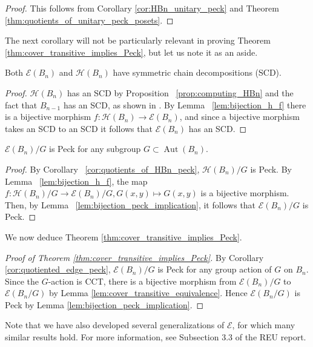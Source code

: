 \documentclass[smallextended, envcountsame, numbook]{svjour3}
\numberwithin{equation}{section}
\newcommand\Aut{\operatorname{Aut}}
\begin{document}
\begin{proof}
This follows from Corollary \ref{cor:HBn_unitary_peck} and Theorem \ref{thm:quotients_of_unitary_peck_posets}.
\end{proof}

The next corollary will not be particularly relevant in proving Theorem \ref{thm:cover_transitive_implies_Peck}, but let us note it as an aside.

\begin{corollary}
Both $\mathcal{E}(B_n)$ and $\mathcal H(B_n)$ have symmetric chain decompositions (SCD).
\end{corollary}


\begin{proof}
$\mathcal{H}(B_n)$ has an SCD by Proposition ~\ref{prop:computing_HBn} and the fact that $B_{n-1}$ has an SCD, as shown in \cite{greene}.  By Lemma ~\ref{lem:bijection_h_f} there is a bijective morphism $f\colon\mathcal{H}(B_n)\rightarrow\mathcal{E}(B_n)$, and since a bijective morphism takes an SCD to an SCD it follows that $\mathcal{E}(B_n)$ has an SCD.
\end{proof}


\begin{corollary}
\label{cor:quotiented_edge_peck}
$\mathcal E(B_n)/G$ is Peck for any subgroup $G\subset \Aut(B_n)$.
\end{corollary}
\begin{proof}
By Corollary ~\ref{cor:quotients_of_HBn_peck}, $\mathcal H(B_n)/G$ is Peck. By Lemma ~\ref{lem:bijection_h_f}, the map $f\colon\mathcal H(B_n)/G \rightarrow \mathcal E(B_n)/G,G(x, y) \mapsto G(x, y)$ is a bijective morphism. Then, by Lemma ~\ref{lem:bijection_peck_implication}, it follows that $\mathcal E(B_n)/G$ is Peck.
\end{proof}

We now deduce Theorem \ref{thm:cover_transitive_implies_Peck}.

\begin{proof}[Proof of Theorem \ref{thm:cover_transitive_implies_Peck}]
By Corollary \ref{cor:quotiented_edge_peck}, $\mathcal{E}(B_n)/G$ is Peck for any group action of $G$ on $B_n$. Since the $G$-action is CCT, there is a bijective morphism from $\mathcal{E}(B_n)/G$ to $\mathcal{E}(B_n/G)$ by Lemma \ref{lem:cover_transitive_equivalence}. Hence $\mathcal{E}(B_n/G)$ is Peck by Lemma \ref{lem:bijection_peck_implication}.
\end{proof}

Note that we have also developed several generalizations of $\mathcal E$, for which many similar results hold. For more information, see Subsection 3.3 of the REU report.
\end{document}
